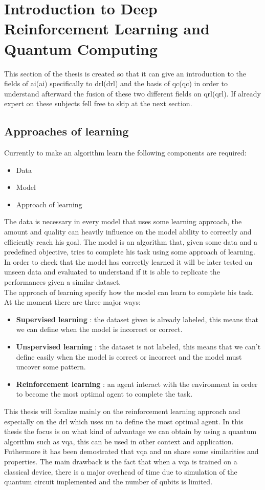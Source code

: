 \section{Introduction to Deep Reinforcement Learning and Quantum Computing}
This section of the thesis is created so that it can give an introduction to the fields of \acrlong{ai}(\acrshort{ai}) specifically to \acrlong{drl}(\acrshort{drl}) and the basis of \acrlong{qc}(\acrshort{qc}) in order to understand afterward the fusion of these two different fields on \acrlong{qrl}(\acrshort{qrl}). If already expert on these subjects fell free to skip at the next section.
\subsection{Approaches of learning}
Currently to make an algorithm learn the following components are required:
\begin{itemize}
	\item Data
	\item Model
	\item Approach of learning
\end{itemize}
The data is necessary in every model that uses some learning approach, the amount and quality can heavily influence on the model ability to correctly and efficiently reach his goal. 
The model is an algorithm that, given some data and a predefined objective, tries to complete his task using some approach of learning. In order to check that the model has correctly learned it will be later tested on unseen data and evaluated to understand if it is able to replicate the performances given a similar dataset.\\
The approach of learning specify how the model can learn to complete his task. At the moment there are three major ways:
\begin{itemize}
	\item \textbf{Supervised learning} : the dataset given is already labeled, this means that we can define when the model is incorrect or correct.
	\item \textbf{Unspervised learning} : the dataset is not labeled, this means that we can't define easily when the model is correct or incorrect and the model must uncover some pattern.
	\item \textbf{Reinforcement learning} : an agent interact with the environment in order to become the most optimal agent to complete the task.
\end{itemize}
This thesis will focalize mainly on the reinforcement learning approach and especially on the \acrfull{drl} which uses \acrfull{nn} to define the most optimal agent.
In this thesis the focus is on what kind of advantage we can obtain by using a quantum algorithm such as \acrfull{vqa}, this can be used in other context and application. Futhermore it has been demostrated that \acrshort{vqa} and \acrshort{nn} share some similarities and properties. The main drawback is the fact that when a \acrshort{vqa} is trained on a classical device, there is a major overhead of time due to simulation of the quantum circuit implemented and the number of qubits is limited.
\newpage
